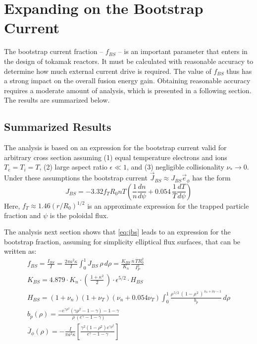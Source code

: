 \chapter{Expanding on the Bootstrap Current}

\label{chapter:bootstrap}

The bootstrap current fraction -- $f_{BS}$ -- is an important parameter that enters in the design of tokamak reactors. It must be calculated with reasonable accuracy to determine how much external current drive is required. The value of $f_{BS}$ thus has a strong impact on the overall fusion energy gain. Obtaining reasonable accuracy requires a moderate amount of analysis, which is presented in a following section. The results are summarized below.

\section{Summarized Results}

The analysis is based on an expression for the bootstrap current valid for arbitrary cross section assuming (1) equal temperature electrons and ions $T_e = T_i = T$, (2) large aspect ratio $\epsilon \ll 1$, and (3) negligible collisionality $\nu_* \rightarrow 0$. Under these assumptions the bootstrap current $\vec J_{BS} \approx J_{BS} \vec e_\phi$ has the form
\begin{equation}
	\label{eq:jbs}
	J_{BS} = -3.32 f_T R_0 n T \left( \frac{1}{n} \frac{dn}{d\psi} + 0.054 \, \frac{1}{T} \frac{dT}{d\psi} \right)
\end{equation}
Here, $f_T \approx 1.46 ( r / R_0 )^{1/2}$ is an approximate expression for the trapped particle fraction and $\psi$ is the poloidal flux.

The analysis next section shows that \cref{eq:jbs} leads to an expression for the bootstrap fraction, assuming for simplicity elliptical flux surfaces, that can be written as:
\begin{gather}
	f_{BS} = \frac{I_{BS}}{I} = \frac{ 2 \pi a^2 \kappa }{I} \int_0^1 J_{BS} \, \rho \, d\rho = \frac{ K_{BS} }{ K_n } \frac{\overline n \, \overline T R_0^2}{I_P^2} \\
  K_{BS} = 4.879 \cdot  K_n \cdot \left( \, \frac{1+\kappa^2}{2} \, \right) \cdot \epsilon^{5/2} \cdot H_{BS} \\
  H_{BS} = ( 1 + \nu_n ) ( 1 + \nu_T ) ( \nu_n + 0.054 \nu_T ) \int_0^1 \frac{ \rho^{\,5/2} \, ( \, 1 - \rho^{\,2} \, )^{\, \nu_n + \nu_T - 1} }{b_p} \, d\rho \\
	b_p(\rho) = \frac{ -e^{\gamma\rho^2} ( \gamma\rho^2 - 1 - \gamma ) - 1 - \gamma }{\rho \,( e^\gamma - 1 - \gamma ) } \\
	\overline J_\phi (\rho ) = - \frac{ I }{ \pi a^2 \kappa } \left[ \frac{\gamma^2 ( 1 - \rho ^2 ) e^{\gamma \rho^2}}{e^\gamma - 1 - \gamma} \right]
\end{gather}

